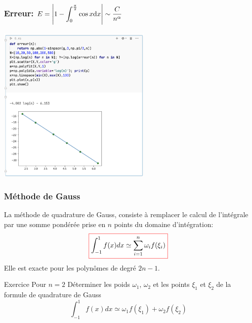 \documentclass{beamer}
\def \de {{\rm d}}
\newcommand{\myredbox}[1]{\fcolorbox{red}{white}{$\displaystyle#1$}}
\begin{document}
\begin{frame}
 \frametitle{Erreur: $\displaystyle E=\left|1 - \int_0^\frac{\pi}{2}\cos x\de x \right|\sim\frac{C}{n^\alpha}$}
\begin{center}
\includegraphics[width=7.5cm]{images/methodeDeSimpson01.png}
\end{center}
 

\end{frame}

\begin{frame}
 \frametitle{Méthode de Gauss}
 La méthode de quadrature de Gauss,  consiste à remplacer le calcul de l'intégrale par une somme pondérée prise en $n$ points du domaine d'intégration: 
 \[\myredbox{ \int_{-1}^1 f(x) dx \simeq \sum_{i=1}^{n}\omega_i f(\xi_i)}\]
  Elle est  exacte pour les polynômes de degré $2n-1$. 
  
 \begin{block}{Exercice}
 Pour $n=2$ Déterminer les poids $\omega_1$, $\omega_2$ et les points $\xi_1$ et $\xi_2$ de la formule de quadrature de Gauss
  \[ \int_{-1}^1 f(x) dx \simeq \omega_1 f(\xi_1)+\omega_2 f(\xi_2)\]
 \end{block}
 
  
 \end{frame}
\end{document}
